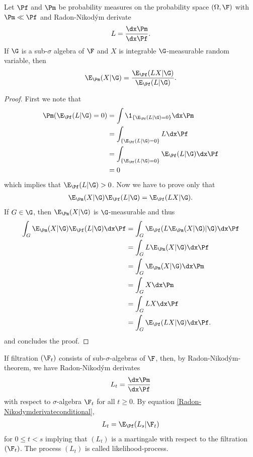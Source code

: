 \begin{thm}
	Let $\Pf$ and $\Pm$ be probability measures on the probability space $(\Omega, \F)$ with $\Pm \ll \Pf$ and Radon-Nikod\'{y}m derivate
	\begin{align}
	L = \frac{ \dx \Pm }{ \dx \Pf } .
	\end{align}
	If $\G$ is a sub-$\sigma$ algebra of $\F$ and $X$ is integrable $\G$-measurable random variable, then
	\begin{align}
	\E_{\Pm} (X| \G) = \frac{\E_{\Pf} (LX| \G)}{\E_{\Pf} (L| \G)} .
	\end{align}
\end{thm}

\begin{proof}
	First we note that
	\begin{align}
	\Pm ( \E_{\Pf} (L| \G) = 0 ) &= \int \1_{ \{ \E_{\Pf} (L| \G) = 0 \} } \dx \Pm \\
	&= \int_{ \{ \E_{\Pf} (L| \G) = 0 \} } L \dx \Pf \\
	&= \int_{ \{ \E_{\Pf} (L| \G) = 0 \} } \E_{\Pf} (L| \G) \dx \Pf \\
	&= 0
	\end{align}
	which implies that $\E_{\Pf} (L| \G) > 0$. Now we have to prove only that 
	\begin{align}
	\E_{\Pm} (X| \G) \E_{\Pf} (L| \G) = \E_{\Pf} (LX| \G) .
	\end{align}
	If $G \in \G$, then $\E_{\Pm} (X| \G)$ is $\G$-measurable and thus
	\begin{align}
	\int_G \E_{\Pm} (X| \G) \E_{\Pf} (L| \G) \dx \Pf &= \int_G \E_{\Pf} (L \E_{\Pm} (X| \G) | \G) \dx \Pf  \\
	&= \int_G L \E_{\Pm} (X| \G)  \dx \Pf  \\
	&= \int_G \E_{\Pm} (X| \G)  \dx \Pm \\
	&= \int_G X \dx \Pm \\
	&= \int_G L X \dx \Pf \\
	&= \int_G \E_{\Pf} (LX | \G ) \dx \Pf .
	\end{align}
	and concludes the proof.
\end{proof}

If filtration $(\F_t)$ consists of sub-$\sigma$-algebras of $\F$, then, by Radon-Nikod\'{y}m-theorem, we have Radon-Nikod\'{y}m derivates
\begin{align}
L_t = \frac{\dx \Pm}{\dx \Pf}
\end{align}
with respect to $\sigma$-algebra $\F_t$ for all $t \geq 0$. By equation \ref{Radon-Nikodymderivateconditional},
\begin{align}
L_t = \E_{\Pf} ( L_s | \F_t )
\end{align}
for $0 \leq t < s$ implying that $(L_t)$ is a martingale with respect to the filtration $(\F_t)$. The process $(L_t)$ is called likelihood-process.

